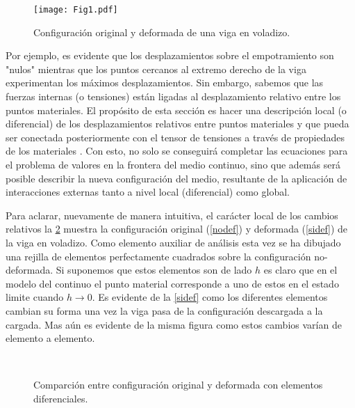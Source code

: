 \documentclass[../notas medios.tex]{subfiles}
\begin{document}
\begin{figure}[H]
\centering
	\texttt{[image: Fig1.pdf]}
	\caption{Configuración original y deformada de una viga en voladizo.}
	\label{viga1}
\end{figure}


Por ejemplo, es evidente que los desplazamientos sobre el empotramiento son "nulos" mientras que los puntos cercanos al extremo derecho de la viga experimentan los máximos desplazamientos. Sin embargo, sabemos que las fuerzas internas (o tensiones) están ligadas al desplazamiento relativo entre los puntos materiales. El propósito de esta sección es hacer una descripción local (o diferencial) de los desplazamientos relativos entre puntos materiales y que pueda ser conectada posteriormente con el tensor de tensiones a través de propiedades de los materiales . Con esto, no solo se conseguirá completar las ecuaciones para el problema de valores en la frontera del medio continuo, sino que además será posible describir la nueva configuración del medio, resultante de la aplicación de interacciones externas tanto a nivel local (diferencial) como global.

Para aclarar, nuevamente de manera intuitiva, el carácter local de los cambios relativos la \cref{steady_state} muestra la configuración original (\cref{nodef}) y deformada (\cref{sidef}) de la viga en voladizo. Como elemento auxiliar de análisis esta vez se ha dibujado una rejilla de elementos perfectamente cuadrados sobre la configuración no-deformada.   Si suponemos que estos elementos son de lado $h$ es claro que en el modelo del continuo el punto material corresponde a uno de estos en el estado limite cuando $h \to 0.$ Es evidente de la \cref{sidef} como los diferentes elementos cambian su forma una vez la viga pasa de la configuración descargada a la cargada. Mas aún es evidente de la misma figura como estos cambios varían de elemento a elemento.

\begin{figure}[H]
     \centering
     \hspace{0.5cm}\\
     \caption{Comparción entre configuración original y deformada con elementos diferenciales.}
     \label{steady_state}
\end{figure}
\end{document}
